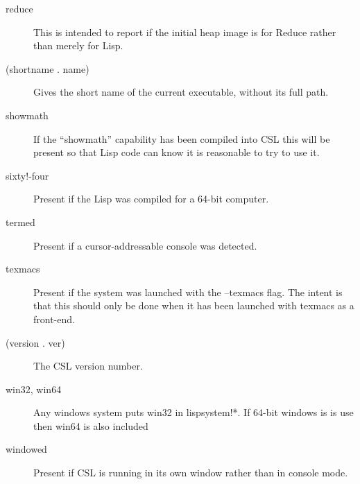 \documentclass[a4paper,11pt]{article}
\begin{document}
\begin{description}
\item[{\ttfamily reduce}]
This is intended to report if the initial heap image is for Reduce rather than
merely for Lisp.

\item[{\ttfamily  (shortname . name)}]
Gives the short name of the current executable, without its full path.

\item[{\ttfamily showmath}]
If the ``showmath'' capability has been compiled into CSL this will be present
so that Lisp code can know it is reasonable to try to use it.

\item[{\ttfamily  sixty!-four}]
Present if the Lisp was compiled for a 64-bit computer.

\item[{\ttfamily termed}]
Present if a cursor-addressable console was detected.

\item[{\ttfamily texmacs}]
Present if the system was launched with the {\ttfamily --texmacs} flag.
The intent is that this should only be done when it has been launched with
texmacs as a front-end.

\item[{\ttfamily  (version . ver)}]
The CSL version number.

\item[{\ttfamily win32}, {\ttfamily win64}]
Any windows system puts {\ttfamily win32} in {\ttfamily lispsystem!*}.
If 64-bit windows is is use then {\ttfamily win64} is also included

\item[{\ttfamily windowed}]
Present if CSL is running in its own window rather than in console mode.

\end{description}
\end{document}
